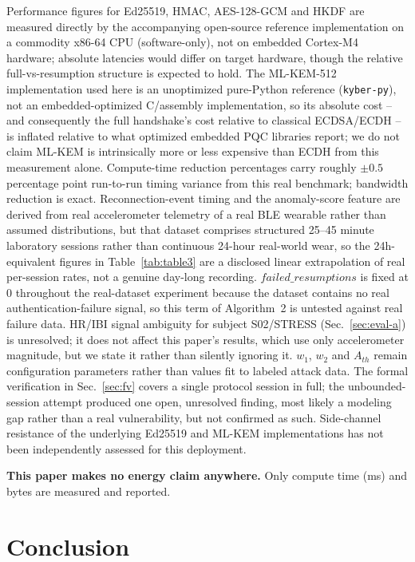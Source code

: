 \documentclass[conference]{IEEEtran}
\begin{document}
Performance figures for Ed25519, HMAC, AES-128-GCM and HKDF are measured
directly by the accompanying open-source reference implementation on a
commodity x86-64 CPU (software-only), not on embedded Cortex-M4 hardware;
absolute latencies would differ on target hardware, though the relative
full-vs-resumption structure is expected to hold. The ML-KEM-512
implementation used here is an unoptimized pure-Python reference
(\texttt{kyber-py}), not an embedded-optimized C/assembly implementation,
so its absolute cost -- and consequently the full handshake's cost
relative to classical ECDSA/ECDH -- is inflated relative to what optimized
embedded PQC libraries report; we do not claim ML-KEM is intrinsically more
or less expensive than ECDH from this measurement alone. Compute-time
reduction percentages carry roughly $\pm0.5$ percentage point run-to-run
timing variance from this real benchmark; bandwidth reduction is exact.
Reconnection-event timing and the anomaly-score feature are derived from
real accelerometer telemetry of a real BLE wearable rather than assumed
distributions, but that dataset comprises structured 25--45 minute
laboratory sessions rather than continuous 24-hour real-world wear, so the
24h-equivalent figures in Table~\ref{tab:table3} are a disclosed linear
extrapolation of real per-session rates, not a genuine day-long recording.
$\mathit{failed\_resumptions}$ is fixed at 0 throughout the real-dataset
experiment because the dataset contains no real authentication-failure
signal, so this term of Algorithm~2 is untested against real failure data.
HR/IBI signal ambiguity for subject S02/STRESS (Sec.~\ref{sec:eval-a}) is
unresolved; it does not affect this paper's results, which use only
accelerometer magnitude, but we state it rather than silently ignoring it.
$w_1$, $w_2$ and $A_{th}$ remain configuration parameters rather than
values fit to labeled attack data. The formal verification in
Sec.~\ref{sec:fv} covers a single protocol session in full; the
unbounded-session attempt produced one open, unresolved finding, most
likely a modeling gap rather than a real vulnerability, but not confirmed
as such. Side-channel resistance of the underlying Ed25519 and ML-KEM
implementations has not been independently assessed for this deployment.

\textbf{This paper makes no energy claim anywhere.} Only compute time (ms)
and bytes are measured and reported.

\section{Conclusion}
\end{document}
